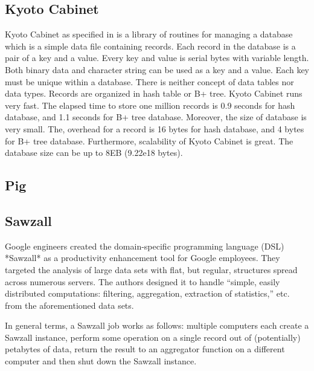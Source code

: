 \subsection{ Kyoto Cabinet}

     Kyoto Cabinet as specified in \cite{www-KyotoCabinet} is a
     library of routines for managing a database which is a simple
     data file containing records. Each record in the database is a
     pair of a key and a value. Every key and value is serial bytes
     with variable length. Both binary data and character string can
     be used as a key and a value. Each key must be unique within a
     database.  There is neither concept of data tables nor data
     types. Records are organized in hash table or B+ tree. Kyoto
     Cabinet runs very fast. The elapsed time to store one million
     records is 0.9 seconds for hash database, and 1.1 seconds for B+
     tree database. Moreover, the size of database is very small. The,
     overhead for a record is 16 bytes for hash database, and 4 bytes
     for B+ tree database. Furthermore, scalability of Kyoto Cabinet
     is great. The database size can be up to 8EB (9.22e18 bytes).

\subsection{ Pig}
\subsection{ Sawzall}

     Google engineers created the domain-specific programming language
     (DSL) *Sawzall* as a productivity enhancement tool for Google
     employees.  They targeted the analysis of large data sets with
     flat, but regular, structures spread across numerous servers.
     The authors designed it to handle ``simple, easily distributed
     computations: filtering, aggregation, extraction of statistics,''
     etc. from the aforementioned data sets.
     \cite{pike05sawzall}

     In general terms, a Sawzall job works as follows: multiple
     computers each create a Sawzall instance, perform some operation
     on a single record out of (potentially) petabytes of data, return
     the result to an aggregator function on a different computer and
     then shut down the Sawzall instance.

